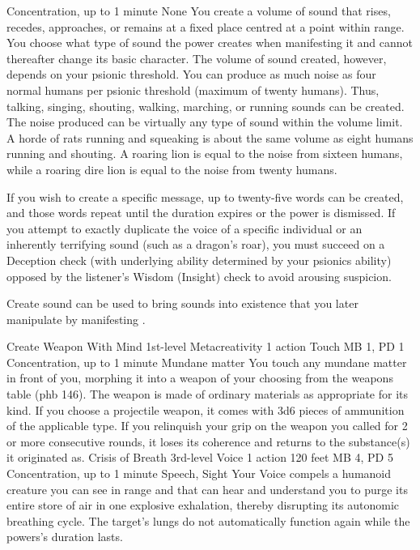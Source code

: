     {Concentration, up to 1 minute}
    {None}
You create a volume of sound that rises,
recedes, approaches, or remains at a fixed place centred at
a point within range. You choose what type of sound the power
creates when manifesting it and cannot thereafter change its
basic character. The volume of sound created, however, depends
on your psionic threshold. You can produce as much noise as
four normal humans per psionic threshold (maximum of twenty humans).
Thus, talking, singing, shouting, walking, marching, or running
sounds can be created. The noise produced can be virtually
any type of sound within the volume limit. A horde of rats
running and squeaking is about the same volume as eight humans
running and shouting. A roaring lion is equal to the noise
from sixteen humans, while a roaring dire lion is equal to
the noise from twenty humans.

If you wish to create a specific message, up to twenty-five
words can be created, and those words repeat
until the duration expires or the power is dismissed. If you
attempt to exactly duplicate the voice of a specific individual
or an inherently terrifying sound (such as a dragon's roar),
you must succeed on a Deception check
(with underlying ability determined by your psionics ability)
opposed by the listener's
Wisdom (Insight) check to avoid arousing suspicion.

Create sound can be used to bring sounds into existence that
you later manipulate by manifesting .

\DndPowerHeader%
    {Create Weapon With Mind\label{pwr:create_weapon_with_mind}}
    {1st-level Metacreativity}
    {1 action}
    {Touch}
    {MB 1, PD 1}
    {Concentration, up to 1 minute}
    {Mundane matter}
You touch any mundane matter in front of
you, morphing it into a weapon of your choosing from the weapons
table (phb 146). The weapon is made of ordinary materials
as appropriate for its kind. If you choose a projectile weapon,
it comes with 3d6 pieces of ammunition of the applicable type.
If you relinquish your grip on the weapon you called for 2
or more consecutive rounds, it loses its coherence and returns
to the substance(s) it originated as.
\DndPowerHeader%
    {Crisis of Breath\label{pwr:crisis_of_breath}}
    {3rd-level Voice}
    {1 action}
    {120 feet}
    {MB 4, PD 5}
    {Concentration, up to 1 minute}
    {Speech, Sight}
Your Voice compels a humanoid creature you
can see in range
and that can hear and understand you
to purge its entire store of air in one explosive
exhalation, thereby disrupting its autonomic breathing
cycle. The target's lungs do not automatically function again
while the powers's duration lasts.

